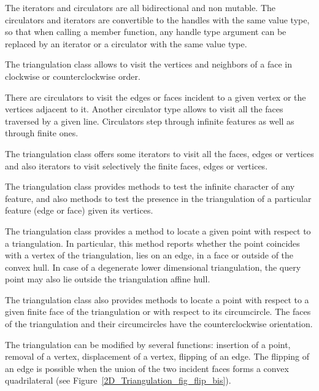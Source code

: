 The iterators and circulators
are all bidirectional and non mutable.
The circulators and iterators are convertible to the 
handles with the same value type, so that 
when calling a member function,
any handle type argument can be replaced
by an iterator or a circulator
with the same value type.

The triangulation class allows to visit the vertices
and  neighbors of a face in clockwise or counterclockwise order. 

There are circulators  
to visit the edges or faces 
incident to a given vertex or the  vertices 
adjacent to it.
Another circulator type allows to visit all the faces
traversed by a given line.
Circulators step through infinite features as well as 
through finite ones. 

The triangulation class offers 
some iterators to visit all the 
faces, edges or vertices and also iterators to visit 
selectively the finite
faces, edges  or vertices.



The triangulation class provides methods to test
the infinite character of any feature,
and also methods to test the presence in the triangulation
of a particular feature (edge or face) given its vertices.

The triangulation class  provides a method to locate
a given point with respect to a triangulation.
In particular, this method reports whether the point
coincides with a vertex of the triangulation, lies on an edge,
in a face or outside of the convex hull. In case of a degenerate 
lower dimensional triangulation, the query point may also lie
outside the triangulation affine hull.

The triangulation class also provides
methods to locate a point with respect to
a given  finite face of the triangulation or with respect to its
circumcircle.
The faces of the triangulation and their circumcircles 
have the  counterclockwise orientation.

The triangulation can be modified by several functions:
insertion of a point, removal of a vertex, displacement of a vertex,
flipping  of an edge. The flipping of an edge
is possible when the union of the two incident faces
forms  a convex quadrilateral (see Figure~\ref{2D_Triangulation_fig_flip_bis}). 

